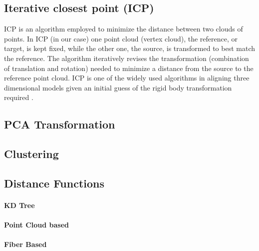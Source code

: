 \documentclass[../structure.tex]{subfiles}
\begin{document}
		\subsection{Iterative closest point (ICP)}
		ICP is an algorithm employed to minimize the distance between two clouds of points. %
		In ICP (in our case) one point cloud (vertex cloud), the reference, or target, is kept fixed, while the other one, the source, is transformed to best match the reference. The algorithm iteratively revises the transformation (combination of translation and rotation) needed to minimize a distance from the source to the reference point cloud. ICP is one of the widely used algorithms in aligning three dimensional models given an initial guess of the rigid body transformation required \cite{Rusinkiewicza2001}.
		\subsection{PCA Transformation}
		\subsection{Clustering}
		\subsection{Distance Functions}
			\paragraph{KD Tree}
			\paragraph{Point Cloud based}
			\paragraph{Fiber Based}
\end{document}
